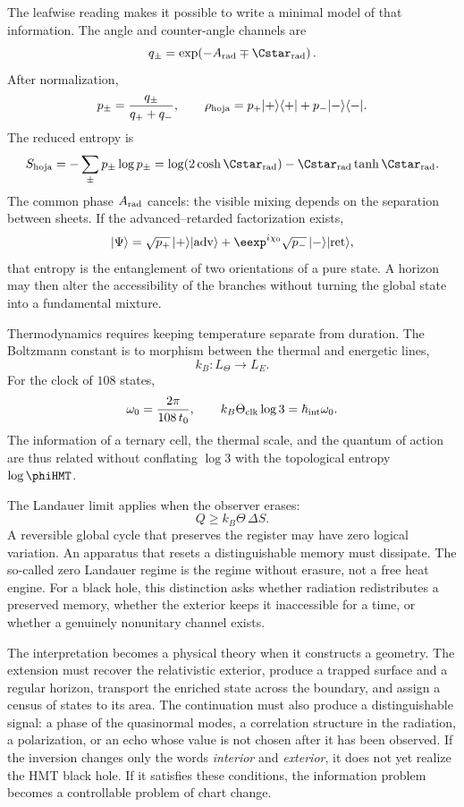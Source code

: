 The leafwise reading makes it possible to write a minimal model of that information. The
angle and counter-angle channels are
\[
 q_\pm
 =
 \exp\!\left(-A_{\rm rad}\mp \Cstar_{\rm rad}\right).
\]
After normalization,
\[
 p_\pm=\frac{q_\pm}{q_++q_-},
\qquad
 \rho_{\rm hoja}
 =
 p_+|+\rangle\langle+|
 +
 p_-|-\rangle\langle-|.
\]
The reduced entropy is
\[
 S_{\rm hoja}
 =
 -\sum_{\pm}p_\pm\log p_\pm
 =
 \log\!\left(2\cosh\Cstar_{\rm rad}\right)
 -
 \Cstar_{\rm rad}\tanh\Cstar_{\rm rad}.
\]
The common phase \(A_{\rm rad}\) cancels: the visible mixing depends on the separation
between sheets. If the advanced--retarded factorization exists,
\[
 |\Psi\rangle
 =
 \sqrt{p_+}\,|+\rangle|\mathrm{adv}\rangle
 +
 \eexp^{i\chi_0}
 \sqrt{p_-}\,|-\rangle|\mathrm{ret}\rangle,
\]
that entropy is the entanglement of two orientations of a pure state. A
horizon may then alter the accessibility of the branches without turning the
global state into a fundamental mixture.

Thermodynamics requires keeping temperature separate from duration. The
Boltzmann constant is to morphism between the thermal and energetic lines,
\[
 k_B:L_\Theta\longrightarrow L_E.
\]
For the clock of \(108\) states,
\[
 \omega_0=\frac{2\pi}{108\,t_0},
\qquad
 k_B\Theta_{\rm clk}\log3
 =
 \hbar_{\rm int}\omega_0.
\]
The information of a ternary cell, the thermal scale, and the quantum of action are
thus related without conflating \(\log3\) with the topological entropy
\(\log\phiHMT\).

The Landauer limit applies when the observer erases:
\[
 Q\geq k_B\Theta\,\Delta S.
\]
A reversible global cycle that preserves the register may have zero logical
variation. An apparatus that resets a distinguishable memory must dissipate. The
so-called zero Landauer regime is the regime without erasure, not a free heat engine.
For a black hole, this distinction asks whether radiation redistributes a
preserved memory, whether the exterior keeps it inaccessible for a time, or whether
a genuinely nonunitary channel exists.

The interpretation becomes a physical theory when it constructs a geometry. The extension must recover the relativistic exterior, produce a trapped surface and a regular horizon, transport the enriched state across the boundary, and assign a census of states to its area. The continuation must also produce a distinguishable signal: a phase of the quasinormal modes, a correlation structure in the radiation, a polarization, or an echo whose value is not chosen after it has been observed. If the inversion changes only the words \emph{interior} and \emph{exterior}, it does not yet realize the HMT black hole. If it satisfies these conditions, the information problem becomes a controllable problem of chart change.


